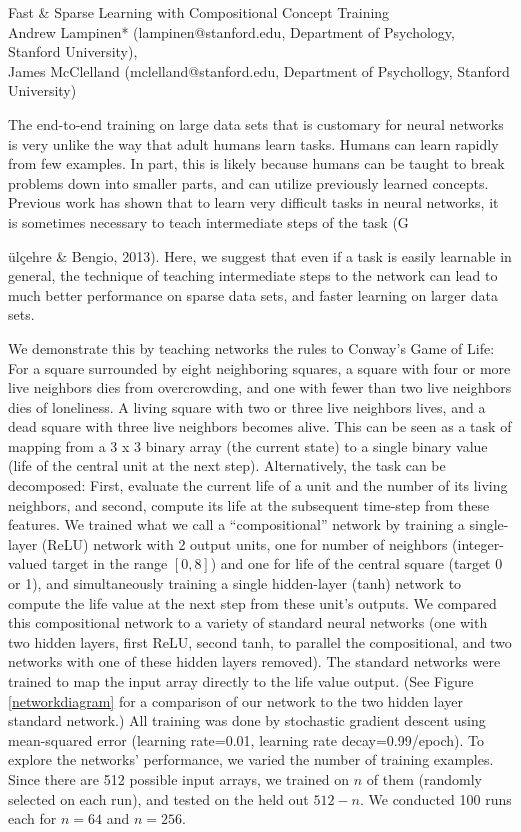 \documentclass[10pt]{article}
\begin{document}
\begingroup  
  \centering
  \large Fast \& Sparse Learning with Compositional Concept Training\\[1em]
  \small{Andrew Lampinen* (lampinen@stanford.edu, Department of Psychology, Stanford University),\\ James McClelland (mclelland@stanford.edu, Department of Psychollogy, Stanford University)}\par
\endgroup
\vspace{10pt}
The end-to-end training on large data sets that is customary for neural networks is very unlike the way that adult humans learn tasks. Humans can learn rapidly from few examples. In part, this is likely because humans can be taught to break problems down into smaller parts, and can utilize previously learned concepts. Previous work has shown that to learn very difficult tasks in neural networks, it is sometimes necessary to teach intermediate steps of the task (G{\"{u}l\c{c}ehre \& Bengio, 2013). Here, we suggest that even if a task is easily learnable in general, the technique of teaching intermediate steps to the network can lead to much better performance on sparse data sets, and faster learning on larger data sets.\par
We demonstrate this by teaching networks the rules to Conway's Game of Life: For a square surrounded by eight neighboring squares, a square with four or more live neighbors dies from overcrowding, and one with fewer than two live neighbors dies of loneliness. A living square with two or three live neighbors lives, and a dead square with three live neighbors becomes alive. This can be seen as a task of mapping from a 3 x 3 binary array (the current state) to a single binary value (life of the central unit at the next step). Alternatively, the task can be decomposed: First, evaluate the current life of a unit and the number of its living neighbors, and second, compute its life at the subsequent time-step from these features. We trained what we call a ``compositional'' network by training a single-layer (ReLU) network with 2 output units, one for number of neighbors (integer-valued target in the range $[0,8]$) and one for life of the central square (target 0 or 1), and simultaneously training a single hidden-layer (tanh) network to compute the life value at the next step from these unit's outputs. We compared this compositional network to a variety of standard neural networks (one with two hidden layers, first ReLU, second tanh, to parallel the compositional, and two networks with one of these hidden layers removed). The standard networks were trained to map the input array directly to the life value output. (See Figure \ref{networkdiagram} for a comparison of our network to the two hidden layer standard network.) All training was done by stochastic gradient descent using mean-squared error (learning rate=0.01, learning rate decay=0.99/epoch). To explore the networks' performance, we varied the number of training examples. Since there are 512 possible input arrays, we trained on $n$ of them (randomly selected on each run), and tested on the held out $512-n$. We conducted 100 runs each for $n = 64$ and $n=256$.\par
}
\end{document}
